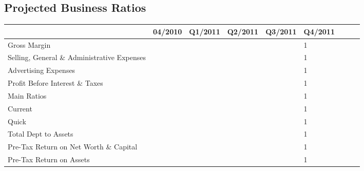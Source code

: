 \documentclass[11pt,a4paper,titlepage]{article}
\begin{document}
\newpage
\thispagestyle{empty}
\begin{landscape}
\subsection{Projected Business Ratios}
\begin{scriptsize}
\begin{tabular}{ | l | l | l | l | l | l | l | l | l |}\hline
  & 04/2010 & Q1/2011 & Q2/2011 & Q3/2011 & Q4/2011\\\hline
  Gross Margin & & & & & 1\\ \hline
  Selling, General \& Administrative Expenses & & & & & 1\\\hline
  Advertising Expenses & & & & & 1\\ \hline
  Profit Before Interest \& Taxes & & & & & 1\\\hline
  Main Ratios & & & & & 1\\ \hline
  Current & & & & & 1\\\hline
  Quick & & & & & 1\\ \hline
  Total Dept to Assets & & & & & 1\\\hline
  Pre-Tax Return on Net Worth \& Capital & & & & & 1\\ \hline
  Pre-Tax Return on Assets & & & & & 1\\\hline

\end{tabular}
\end{scriptsize}
\end{landscape}
\end{document}
